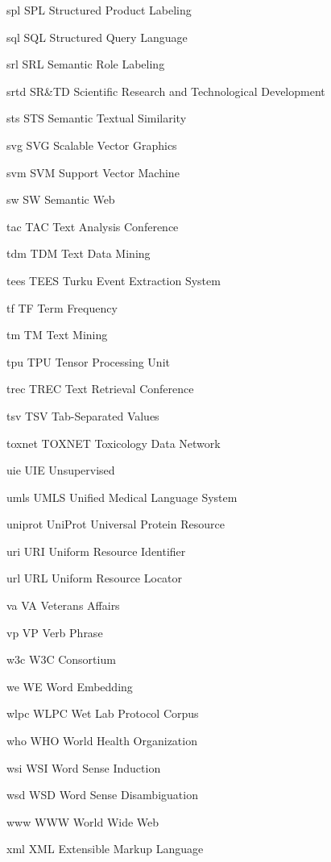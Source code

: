 \newabbreviation
{spl}
{SPL}
{Structured Product Labeling}

\newabbreviation
{sql}
{SQL}
{Structured Query Language}

\newabbreviation
{srl}
{SRL}
{Semantic Role Labeling}

\newabbreviation
{srtd}
{SR\&TD}
{Scientific Research and Technological Development}

\newabbreviation
{sts}
{STS}
{Semantic Textual Similarity}

\newabbreviation
{svg}
{SVG}
{Scalable Vector Graphics}

\newabbreviation
{svm}
{SVM}
{Support Vector Machine}

\newabbreviation
{sw}
{SW}
{Semantic Web}

\newabbreviation
{tac}
{TAC}
{Text Analysis Conference}

\newabbreviation
{tdm}
{TDM}
{Text Data Mining}

\newabbreviation
{tees}
{TEES}
{Turku Event Extraction System}

\newabbreviation
{tf}
{TF}
{Term Frequency}

\newabbreviation
{tm}
{TM}
{Text Mining}

\newabbreviation
{tpu}
{TPU}
{Tensor Processing Unit}

\newabbreviation
{trec}
{TREC}
{Text Retrieval Conference}

\newabbreviation
{tsv}
{TSV}
{Tab-Separated Values}

\newabbreviation
{toxnet}
{TOXNET}
{Toxicology Data Network}

\newabbreviation
{uie}
{UIE}
{Unsupervised }

\newabbreviation
{umls}
{UMLS}
{Unified Medical Language System}

\newabbreviation
{uniprot}
{UniProt}
{Universal Protein Resource}

\newabbreviation
{uri}
{URI}
{Uniform Resource Identifier}

\newabbreviation
{url}
{URL}
{Uniform Resource Locator}

\newabbreviation
{va}
{VA}
{Veterans Affairs}

\newabbreviation
{vp}
{VP}
{Verb Phrase}

\newabbreviation
{w3c}
{W3C}
{ Consortium}

\newabbreviation
{we}
{WE}
{Word Embedding}

\newabbreviation
{wlpc}
{WLPC}
{Wet Lab Protocol Corpus}

\newabbreviation
{who}
{WHO}
{World Health Organization}

\newabbreviation
{wsi}
{WSI}
{Word Sense Induction}

\newabbreviation
{wsd}
{WSD}
{Word Sense Disambiguation}

\newabbreviation
{www}
{WWW}
{World Wide Web}

\newabbreviation
{xml}
{XML}
{Extensible Markup Language}
